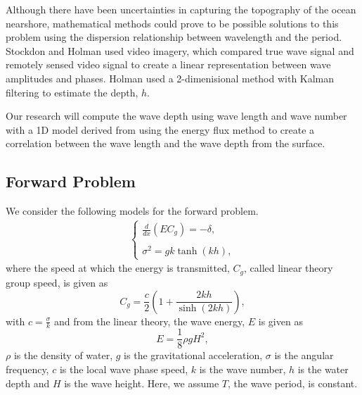 
Although there have been uncertainties in capturing the topography of the ocean nearshore, mathematical methods could prove to be possible solutions to this problem using the dispersion relationship between wavelength and the period. Stockdon and Holman used video imagery, which compared true wave signal and remotely sensed video signal to create a linear representation between wave amplitudes and phases. Holman used a 2-dimenisional method with Kalman filtering to estimate the depth, $h$.

Our research will compute the wave depth using wave length and wave number with a 1D model derived from using the energy flux method to create a correlation between the wave length and the wave depth from the surface.
\subsection{Forward Problem}\label{forwardproblem}
We consider the following models for the forward problem.
\begin{eqnarray}
\label{fp1}
\left \{
\begin{array}{lll}
\frac{d}{dx}\left(EC_g\right)=-\delta,\\
\\
\sigma^2=gk\tanh(kh),
\label{ode}
\end{array}
\right.
\end{eqnarray}
where the speed at which the energy is transmitted, $C_g$, called linear theory group speed, is given as
\begin{equation}
\label{cg}
C_g=\frac{c}{2}\left(1+\frac{2kh}{\sinh(2kh)}\right),
\end{equation}
with $c=\frac{\sigma}{k}$ and from the linear theory, the wave energy, $E$ is given as
\begin{equation}
\label{e}
E=\frac{1}{8}\rho g H^2,
\end{equation}
$\rho$ is the density of water, $g$ is the gravitational acceleration, $\sigma$ is the angular frequency, $c$ is the local wave phase speed, $k$ is the wave number, $h$ is the water depth and $H$ is the wave height. Here, we assume $T$, the wave period, is constant.\\ 

